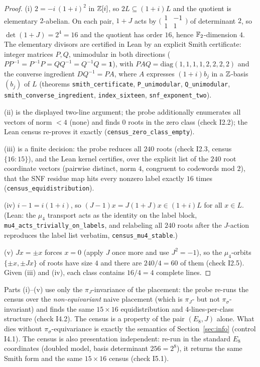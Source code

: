 \begin{proof}
(i) $2=-i\,(1+i)^2$ in $\mathbb Z[i]$, so $2L\subseteq(1+i)L$ and the
quotient is elementary $2$-abelian.  On each pair, $1+J$ acts by
$\bigl(\begin{smallmatrix}1&-1\\1&1\end{smallmatrix}\bigr)$ of
determinant $2$, so $\det(1+J)=2^4=16$ and the quotient has order
$16$, hence $\mathbb F_2$-dimension $4$.  The elementary divisors are
certified in Lean by an explicit Smith certificate: integer matrices
$P,Q$, unimodular in both directions
($PP^{-1}=P^{-1}P=QQ^{-1}=Q^{-1}Q=\mathbf 1$), with
$PAQ=\mathrm{diag}(1,1,1,1,2,2,2,2)$ and the converse ingredient
$DQ^{-1}=PA$, where $A$ expresses $(1+i)b_j$ in a $\mathbb Z$-basis
$(b_j)$ of $L$ (theorems \texttt{smith\_certificate},
\texttt{P\_unimodular}, \texttt{Q\_unimodular},
\texttt{smith\_converse\_ingredient}, \texttt{index\_sixteen},
\texttt{snf\_exponent\_two}).

(ii) is the displayed two-line argument; the probe additionally
enumerates all vectors of norm $<4$ (none) and finds $0$ roots in the
zero class (check I2.2); the Lean census re-proves it exactly
(\texttt{census\_zero\_class\_empty}).

(iii) is a finite decision: the probe reduces all $240$ roots
(check I2.3, census $\{16\colon15\}$), and the Lean kernel certifies,
over the explicit list of the $240$ root coordinate vectors (pairwise
distinct, norm $4$, congruent to codewords mod $2$), that the SNF
residue map hits every nonzero label exactly $16$ times
(\texttt{census\_equidistribution}).

(iv) $i-1=i(1+i)$, so $(J-1)x=J(1+J)x\in(1+i)L$ for all $x\in L$.
(Lean: the $\mu_4$ transport acts as the identity on the label block,
\texttt{mu4\_acts\_trivially\_on\_labels}, and relabeling all $240$
roots after the $J$-action reproduces the label list verbatim,
\texttt{census\_mu4\_stable}.)

(v) $Jx=\pm x$ forces $x=0$ (apply $J$ once more and use $J^2=-1$),
so the $\mu_4$-orbits $\{\pm x,\pm Jx\}$ of roots have size $4$ and
there are $240/4=60$ of them (check I2.5).  Given (iii) and (iv),
each class contains $16/4=4$ complete lines.
\end{proof}

\begin{remark}
\label{rem:placement}
Parts (i)--(v) use only the $\pi_J$-invariance of the placement: the
probe re-runs the census over the \emph{non-equivariant} naive
placement (which is $\pi_J$- but not $\pi_\sigma$-invariant) and
finds the same $15\times16$ equidistribution and $4$-lines-per-class
structure (check I4.2).  The census is a property of the pair
$(E_8,J)$ alone.  What dies without $\pi_\sigma$-equivariance is
exactly the semantics of Section~\ref{sec:info} (control I4.1).  The
census is also presentation independent: re-run in the standard
$E_8$ coordinates (doubled model, basis determinant $256=2^8$), it
returns the same Smith form and the same $15\times16$ census
(check I5.1).
\end{remark}

